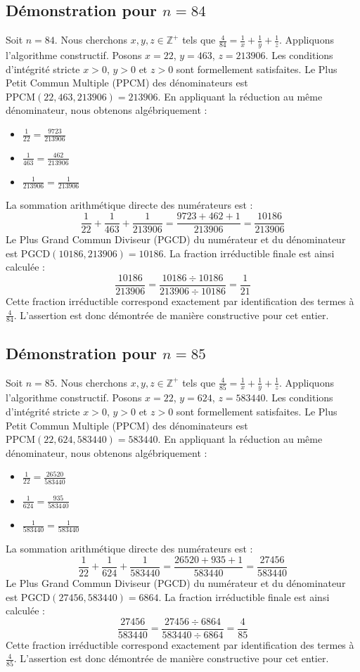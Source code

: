 \documentclass[11pt,a4paper]{article}
\begin{document}
\subsection{Démonstration pour $n = 84$}
Soit $n = 84$. Nous cherchons $x, y, z \in \mathbb{Z}^{+}$ tels que $\frac{4}{84} = \frac{1}{x} + \frac{1}{y} + \frac{1}{z}$.
Appliquons l'algorithme constructif. Posons $x = 22$, $y = 463$, $z = 213906$.
Les conditions d'intégrité stricte $x > 0$, $y > 0$ et $z > 0$ sont formellement satisfaites.
Le Plus Petit Commun Multiple (PPCM) des dénominateurs est $\text{PPCM}(22, 463, 213906) = 213906$.
En appliquant la réduction au même dénominateur, nous obtenons algébriquement :
\begin{itemize}
    \item $\frac{1}{22} = \frac{9723}{213906}$
    \item $\frac{1}{463} = \frac{462}{213906}$
    \item $\frac{1}{213906} = \frac{1}{213906}$
\end{itemize}
La sommation arithmétique directe des numérateurs est :
$$ \frac{1}{22} + \frac{1}{463} + \frac{1}{213906} = \frac{9723 + 462 + 1}{213906} = \frac{10186}{213906} $$
Le Plus Grand Commun Diviseur (PGCD) du numérateur et du dénominateur est $\text{PGCD}(10186, 213906) = 10186$.
La fraction irréductible finale est ainsi calculée :
$$ \frac{10186}{213906} = \frac{10186 \div 10186}{213906 \div 10186} = \frac{1}{21} $$
Cette fraction irréductible correspond exactement par identification des termes à $\frac{4}{84}$. L'assertion est donc démontrée de manière constructive pour cet entier.

\subsection{Démonstration pour $n = 85$}
Soit $n = 85$. Nous cherchons $x, y, z \in \mathbb{Z}^{+}$ tels que $\frac{4}{85} = \frac{1}{x} + \frac{1}{y} + \frac{1}{z}$.
Appliquons l'algorithme constructif. Posons $x = 22$, $y = 624$, $z = 583440$.
Les conditions d'intégrité stricte $x > 0$, $y > 0$ et $z > 0$ sont formellement satisfaites.
Le Plus Petit Commun Multiple (PPCM) des dénominateurs est $\text{PPCM}(22, 624, 583440) = 583440$.
En appliquant la réduction au même dénominateur, nous obtenons algébriquement :
\begin{itemize}
    \item $\frac{1}{22} = \frac{26520}{583440}$
    \item $\frac{1}{624} = \frac{935}{583440}$
    \item $\frac{1}{583440} = \frac{1}{583440}$
\end{itemize}
La sommation arithmétique directe des numérateurs est :
$$ \frac{1}{22} + \frac{1}{624} + \frac{1}{583440} = \frac{26520 + 935 + 1}{583440} = \frac{27456}{583440} $$
Le Plus Grand Commun Diviseur (PGCD) du numérateur et du dénominateur est $\text{PGCD}(27456, 583440) = 6864$.
La fraction irréductible finale est ainsi calculée :
$$ \frac{27456}{583440} = \frac{27456 \div 6864}{583440 \div 6864} = \frac{4}{85} $$
Cette fraction irréductible correspond exactement par identification des termes à $\frac{4}{85}$. L'assertion est donc démontrée de manière constructive pour cet entier.
\end{document}
